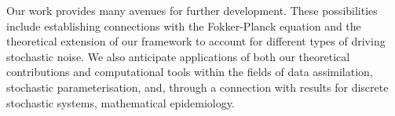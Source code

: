 {  Our work provides many avenues for further development.
  These possibilities include establishing connections with the Fokker-Planck equation and the theoretical extension of our framework to account for different types of driving stochastic noise.
  We also anticipate applications of both our theoretical contributions and computational tools within the fields of data assimilation, stochastic parameterisation, and, through a connection with results for discrete stochastic systems, mathematical epidemiology.
 }
